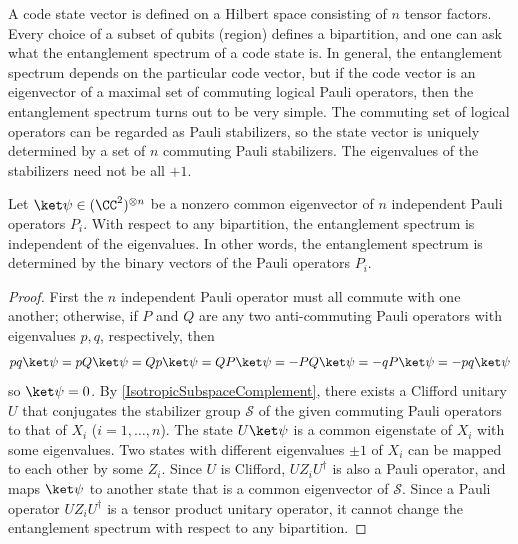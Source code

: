 A code state vector is defined on a Hilbert space consisting of $n$ tensor factors.
Every choice of a subset of qubits (region) defines a bipartition,
and one can ask what the entanglement spectrum of a code state is.
In general, the entanglement spectrum depends on the particular code vector,
but if the code vector is an eigenvector of a maximal set of commuting
logical Pauli operators, then the entanglement spectrum turns out to be very simple.
The commuting set of logical operators can be regarded as Pauli stabilizers,
so the state vector is uniquely determined by a set of $n$ commuting Pauli stabilizers.
The eigenvalues of the stabilizers need not be all $+1$.
\begin{prop}
Let $\ket \psi \in (\CC^2)^{\otimes n}$ be a nonzero common eigenvector of 
$n$ independent Pauli operators $P_i$.
With respect to any bipartition, the entanglement spectrum is independent of the eigenvalues.
In other words, the entanglement spectrum is determined by
the binary vectors of the Pauli operators $P_i$.
\label{EntSpecIndependentOfEigenvalues}
\end{prop}
\begin{proof}
First the $n$ independent Pauli operator must all commute with one another;
otherwise, if $P$ and $Q$ are any two anti-commuting Pauli operators
with eigenvalues $p,q$, respectively, then
\begin{align}
pq \ket \psi = p Q \ket \psi = Q p \ket \psi = Q P \ket \psi = - P Q \ket \psi = -q P \ket \psi = -pq \ket \psi
\label{eq:antiCommutingStabilizers}
\end{align}
so $\ket \psi = 0$.
By \ref{IsotropicSubspaceComplement},
there exists a Clifford unitary $U$ that conjugates the stabilizer group $\mathcal S$ of the given commuting Pauli operators
to that of $X_i$ ($i=1,\ldots,n$).
The state $U \ket \psi$ is a common eigenstate of $X_i$ with some eigenvalues.
Two states with different eigenvalues $\pm 1$ of $X_i$ can be mapped to each other by some $Z_i$.
Since $U$ is Clifford, $U Z_i U^\dagger$ is also a Pauli operator,
and maps $\ket \psi$ to another state that is a common eigenvector of $\mathcal S$.
Since a Pauli operator $U Z_i U^\dagger$ is a tensor product unitary operator,
it cannot change the entanglement spectrum with respect to any bipartition.
\end{proof}

